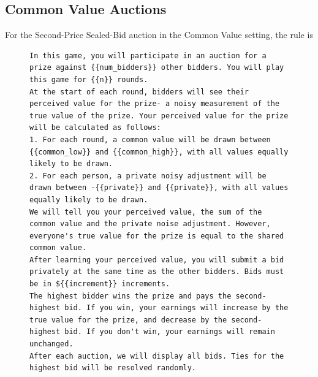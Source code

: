 \documentclass[acmsmall,screen,review]{acmart}
\begin{document}
\subsection{Common Value Auctions}

For the Second-Price Sealed-Bid auction in the Common Value setting, the rule is

\begin{figure}[htbp]
\centering
\begin{minipage}{0.95\textwidth}
\begin{lstlisting}
In this game, you will participate in an auction for a prize against {{num_bidders}} other bidders. You will play this game for {{n}} rounds.
At the start of each round, bidders will see their perceived value for the prize- a noisy measurement of the true value of the prize. Your perceived value for the prize will be calculated as follows:
1. For each round, a common value will be drawn between {{common_low}} and {{common_high}}, with all values equally likely to be drawn.
2. For each person, a private noisy adjustment will be drawn between -{{private}} and {{private}}, with all values equally likely to be drawn.
We will tell you your perceived value, the sum of the common value and the private noise adjustment. However, everyone's true value for the prize is equal to the shared common value.
After learning your perceived value, you will submit a bid privately at the same time as the other bidders. Bids must be in ${{increment}} increments.
The highest bidder wins the prize and pays the second-highest bid. If you win, your earnings will increase by the true value for the prize, and decrease by the second-highest bid. If you don't win, your earnings will remain unchanged.
After each auction, we will display all bids. Ties for the highest bid will be resolved randomly.
\end{lstlisting}
\end{minipage}
\label{fig:sealbid_prompt-6}
\end{figure}
\end{document}
